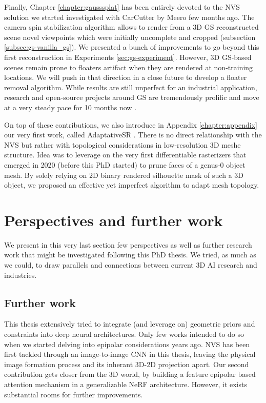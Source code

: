 Finally, Chapter \ref{chapter:gausssplat} has been entirely devoted to the \ac{NVS} solution we started investigated with CarCutter by Meero few months ago. The camera spin stabilization algorithm allows to render from a 3D \ac{GS} reconstructed scene novel viewpoints which were initially uncomplete and cropped (subsection \ref{subsec:gs-vanilla_gs}). We presented a bunch of improvements to go beyond this first reconstruction in Experiments \ref{sec:gs-experiment}. However, 3D \ac{GS}-based scenes remain prone to floaters artifact when they are rendered at non-training locations. We will push in that direction in a close future to develop a floater removal algorithm. While results are still unperfect for an industrial application, research and open-source projects around \ac{GS} \citep{kerbl20233d} are tremendously prolific and move at a very steady pace for 10 months now \citep{luiten2023dynamic,yang2024gaussianobject,wewer24latentsplat}. 

On top of these contributions, we also introduce in Appendix \ref{chapter:appendix} our very first work, called AdaptativeSR \citep{landreau2022adaptativesr}. There is no direct relationship with the \ac{NVS} but rather with topological considerations in low-resolution 3D meshe structure. Idea was to leverage on the very first differentiable rasterizers that emerged in 2020 \citep{liu2019soft} (before this PhD started) to prune faces of a genus-0 object mesh. By solely relying on 2D binary rendered silhouette mask of such a 3D object, we proposed an effective yet imperfect algorithm to adapt mesh topology. 

\section{Perspectives and further work}
We present in this very last section few perspectives as well as further research work that might be investigated following this PhD thesis. We tried, as much as we could, to draw parallels and connections between current 3D \ac{AI} research and industries. 

\subsection{Further work}
This thesis extensively tried to integrate (and leverage on) geometric priors and constraints into deep neural architectures. Only few works intended to do so when we started delving into epipolar considerations years ago. \ac{NVS} has been first tackled through an image-to-image \ac{CNN} in this thesis, leaving the physical image formation process and its inherant 3D-2D projection apart. Our second contribution gets closer from the 3D world, by building a feature epipolar based attention mechanism in a generalizable \ac{NeRF} architecture. However, it exists substantial rooms for further improvements. 

